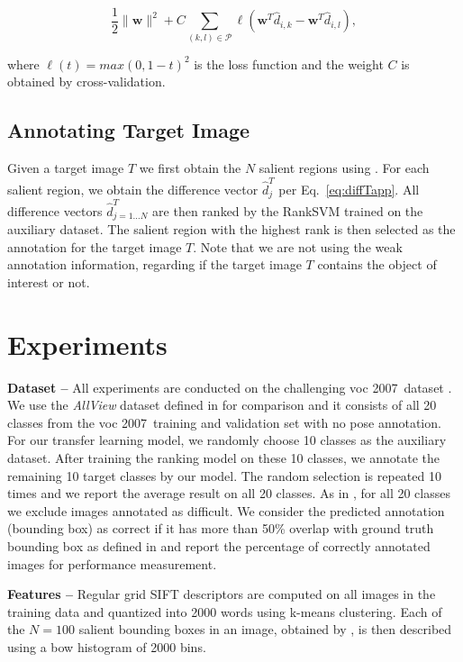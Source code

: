 \documentclass{bmvc2k}
\def\vocs{{\sc voc} 2007}
\def\bow{{{\sc b}o{\sc w} }}
\begin{document}
\begin{equation}
\frac{1}{2} \| \mathbf{w} \|^2 + C \sum_{(k,l) \in \mathcal{P}} \ell(\mathbf{w}^T \hat{d}_{i,k} - \mathbf{w}^T \hat{d}_{i,l}),
\end{equation}

\noindent where $\ell(t) = max(0,1-t)^2$ is the loss function and the weight $C$ is obtained by cross-validation.

\subsection{Annotating Target Image}

Given a target image $T$ we first obtain the $N$ salient regions using \citep{Alexewhatisobject}. For each salient region, we obtain the difference vector $\hat{d}^T_j$ per Eq.~\ref{eq:diffTapp}. All difference vectors $\hat{d}^T_{j=1\ldots N}$ are then ranked by the RankSVM trained on the auxiliary dataset. The salient region with the highest rank is then selected as the annotation for the target image $T$. Note that we are not using the weak annotation information, regarding if the target image $T$ contains the object of interest or not.


\section{Experiments}
\label{sec:experiments}


\noindent \textbf{Dataset --} All experiments are conducted on the challenging \vocs~dataset \cite{pascalvoc2007}. We use the \textit{AllView} dataset defined in \cite{Sivaiccv2011} for comparison and it consists of all 20 classes from the \vocs~training and validation set with no pose annotation. For our transfer learning model, we randomly choose 10 classes as the auxiliary dataset. After training the ranking model on these 10 classes, we annotate the remaining 10 target classes by our model.  The random selection is repeated 10 times and we report the average result on all 20 classes. As in \cite{Pandeyiccv2011,Sivaiccv2011}, for all 20 classes we exclude images annotated as difficult. We consider the predicted annotation (bounding box) as correct if it has more than 50\% overlap with ground truth bounding box as defined in \cite{pascalvoc2007} and report the percentage of correctly annotated images for performance measurement.



\noindent \textbf{Features --} Regular grid SIFT descriptors are computed on all images in the training data and quantized into 2000 words using k-means clustering. Each of the $N=100$ salient bounding boxes in an image, obtained by \cite{Alexewhatisobject}, is then described using a \bow histogram of 2000 bins.
\end{document}
